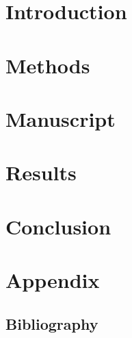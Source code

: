 \documentclass[11pt, titlepage, a4paper, twoside, onecolumn, DIV=calc]{scrbook} %
\begin{document}
\pagestyle{raphimen}




\part{Introduction}

 

 
 
 
 
 
% 
% 

\part{Methods}




\part{Manuscript}
\renewcommand{\cftdot}{}


\pagestyle{raphimen}

\part{Results}




\part{Conclusion}
 

\part{Appendix}
\setcounter{chapter}{11}





\pagestyle{raphimen}



\chapter*{Bibliography}
\end{document}
